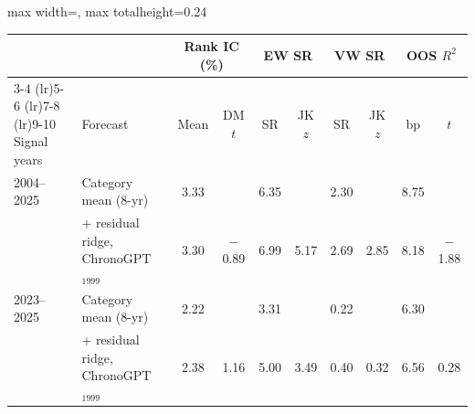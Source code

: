 \begin{table}[htbp]
{\begin{adjustbox}{max width=\linewidth, max totalheight=0.24\textheight}
\begin{tabular}{llcccccccc}
\toprule
\multicolumn{2}{c}{} & \multicolumn{2}{c}{Rank IC (\%)} & \multicolumn{2}{c}{EW SR} & \multicolumn{2}{c}{VW SR} & \multicolumn{2}{c}{OOS $R^2$} \\
\cmidrule(lr){3-4} \cmidrule(lr){5-6} \cmidrule(lr){7-8} \cmidrule(lr){9-10}
Signal years & Forecast & Mean & DM $t$ & SR & JK $z$ & SR & JK $z$ & bp & $t$ \\
\midrule
2004--2025 & Category mean (8-yr) & 3.33 &  & 6.35 &  & 2.30 &  & 8.75 &  \\
 & + residual ridge, ChronoGPT$_{1999}$ & 3.30 & $-$0.89 & 6.99 & 5.17 & 2.69 & 2.85 & 8.18 & $-$1.88 \\
\midrule
2023--2025 & Category mean (8-yr) & 2.22 &  & 3.31 &  & 0.22 &  & 6.30 &  \\
 & + residual ridge, ChronoGPT$_{1999}$ & 2.38 & \phantom{$-$}1.16 & 5.00 & 3.49 & 0.40 & 0.32 & 6.56 & \phantom{$-$}0.28 \\
\bottomrule
\end{tabular}
\end{adjustbox}
}
\end{table}

